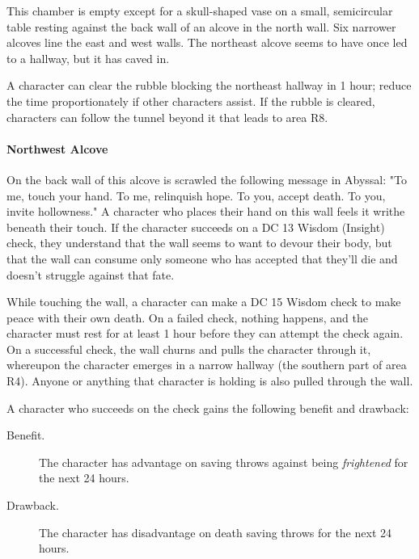 \documentclass[letterpaper, 11pt, bg=full, twocolumn]{dndbook}
\begin{document}
\begin{DndReadAloud}
This chamber is empty except for a skull-shaped vase on a small, semicircular table resting against the back wall of an alcove in the north wall. Six narrower alcoves line the east and west walls. The northeast alcove seems to have once led to a hallway, but it has caved in.
\end{DndReadAloud}

A character can clear the rubble blocking the northeast hallway in 1 hour; reduce the time proportionately if other characters assist. If the rubble is cleared, characters can follow the tunnel beyond it that leads to area R8.

\paragraph{Northwest Alcove}

On the back wall of this alcove is scrawled the following message in Abyssal: "To me, touch your hand. To me, relinquish hope. To you, accept death. To you, invite hollowness." A character who places their hand on this wall feels it writhe beneath their touch. If the character succeeds on a DC 13 Wisdom (Insight) check, they understand that the wall seems to want to devour their body, but that the wall can consume only someone who has accepted that they'll die and doesn't struggle against that fate.

While touching the wall, a character can make a DC 15 Wisdom check to make peace with their own death. On a failed check, nothing happens, and the character must rest for at least 1 hour before they can attempt the check again. On a successful check, the wall churns and pulls the character through it, whereupon the character emerges in a narrow hallway (the southern part of area R4). Anyone or anything that character is holding is also pulled through the wall.

A character who succeeds on the check gains the following benefit and drawback:

\begin{DndSidebar}{}
\begin{description}
\item[Benefit.] The character has advantage on saving throws against being \textit{frightened} for the next 24 hours.
\item[Drawback.] The character has disadvantage on death saving throws for the next 24 hours.
\end{description}
\end{DndSidebar}
\end{document}
